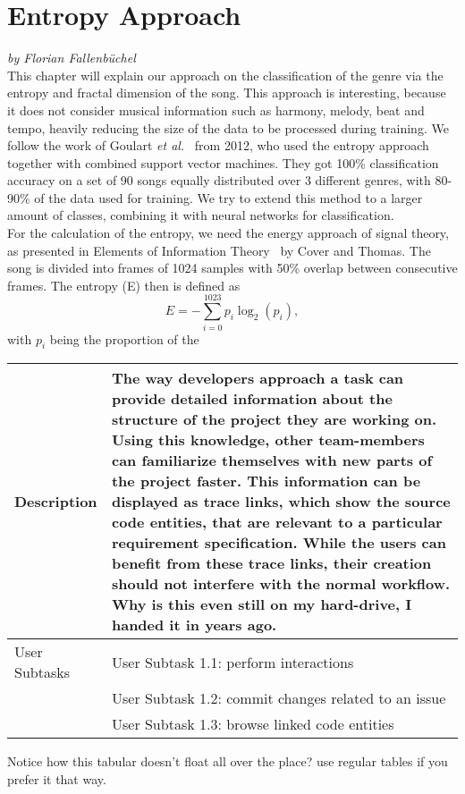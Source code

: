 \chapter{Entropy Approach}
\textit{by Florian Fallenbüchel}\\
This chapter will explain our approach on the classification of the
genre via the entropy and fractal dimension of the song. This approach
is interesting, because it does not consider musical information such as
harmony, melody, beat and tempo, heavily reducing the size of the data
to be processed during training. We follow the work of Goulart
\textit{et al.}~\cite{entropy} from 2012, who used the entropy approach
together with combined support vector machines. They got 100\%
classification accuracy on a set of 90 songs equally distributed over 3
different genres, with 80-90\% of the data used for training. We try
to extend this method to a larger amount of classes, combining it with
neural networks for classification.\\
For the calculation of the entropy, we need the energy approach of
signal theory, as presented in Elements of Information
Theory~\cite{infotheo} by Cover and Thomas. The song is divided into
frames of 1024 samples with 50\% overlap between consecutive frames.
The entropy (E) then is defined as
\begin{equation}
	E = - \sum_{i=0}^{1023} p_{i} \log_{2}(p_{i}),
\end{equation}
with $p_{i}$ being the proportion of the


\begin{center}
\begin{tabular}{ p{}  p{ }}

	Description & The way developers approach a task can provide detailed information about the structure of the project they are working on.
	Using this knowledge, other team-members can familiarize themselves with new parts of the project faster.
	This information can be displayed as trace links, which show the source code entities, that are relevant to a particular requirement specification.
	While the users can benefit from these trace links, their creation should not interfere with the normal workflow. Why is this even still on my hard-drive, I handed it in years ago.\\
	\hline
	User Subtasks & User Subtask 1.1: perform interactions\\
	& User Subtask 1.2: commit changes related to an issue\\
	& User Subtask 1.3: browse linked code entities\\	
\end{tabular}
	\label{tab:somerandomtablethatshouldnotbehere}
\end{center}

Notice how this tabular doesn't float all over the place? use regular tables if you prefer it that way.